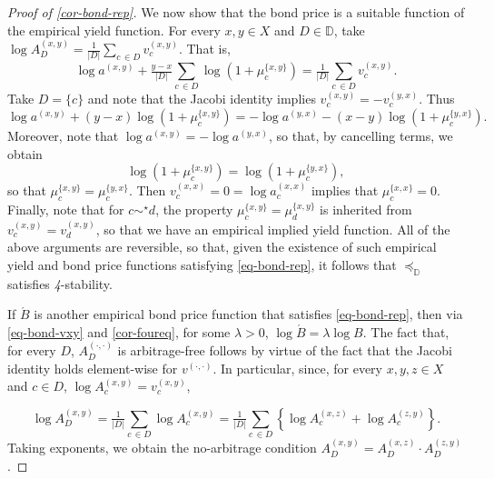 \documentclass[12pt,a4paper,twoside]{article}
\newcommand{\mbbd}{{\mathds D}}
\newcommand{\xx}{(x,x)}
\newcommand{\xy}{{(x, y)}}
\newcommand{\yx}{{(y, x)}}
\newcommand{\zy}{{(z,y)}}
\newcommand{\xz}{{(x,z)}}
\newcommand{\dd}{{(\cdot,\cdot)}}
\newcommand{\stability}{\textit{4}-\textup{{stability}}}
\begin{document}
\begin{proof}[Proof of \cref{cor-bond-rep}]
We now show that the bond price is a suitable function of the empirical yield
  function.  For every $x,y \in X$ and $D \in \mbbd$, take $\log
  {A}^{\xy}_{D} = \tfrac{1}{\lvert D\rvert}\sum_{c\,\in D}v^{\xy}_{c}$. 
  That is,
  \begin{equation*}\log a^{\xy} +
  \tfrac{y - x}{\lvert D\rvert} \sum_{c\,\in D}\log
  \left(1+\mu^{\{x,y\}}_{c}\right) = \tfrac{1}{\lvert D\rvert}\sum_{c\,\in D} v^{\xy}_{c}. \end{equation*}
Take $D = \{c\}$ and note that the Jacobi identity implies $v^{\xy}_c = -
  v^{\yx}_c$. Thus
  \begin{equation*}\log a^{\xy} + (y - x) \log \left(1+\mu^{\{x,y\}}_{c}\right) = -\log
  a^{\yx} - (x - y) \log \left(1+\mu^{\{y,x\}}_{c}\right). \end{equation*}
Moreover, note
  that $\log a^{\xy} = -\log a^{\yx}$, so that, by cancelling terms, we obtain
  \begin{equation}\label{eq-mu-sym} \log \left(1+\mu^{\{x,y\}}_{c}\right)
    = \log \left(1+\mu^{\{y,x\}}_{c}\right),
  \end{equation}
so that $\mu^{\{x,y\}}_{c} = \mu^{\{y,x\}}_{c}$.
  Then $v^{\xx}_{c} = 0 = \log a^{\xx}_{c} $ implies that $\mu^{\{x,x\}}_{c} = 0$.
 Finally, note that for $c \sim^{\star} d$, the property $\mu^{\{x,y\}}_{c} =
 \mu^{\{x,y\}}_{d}$ is inherited from $v^{\xy}_{c} = v^{\xy}_{d}$, so that we
 have an empirical implied yield function. All of the above arguments are
  reversible, so that, given the existence of such empirical yield and bond
  price functions satisfying \eqref{eq-bond-rep}, it follows that
  $\preceq_{\mbbd}$ satisfies \stability.

If $\acute{B}$ is another empirical bond price function that satisfies
  \eqref{eq-bond-rep}, then via \cref{eq-bond-vxy} and \cref{cor-foureq}, for
  some $\lambda >0$, $\log \acute{B} = \lambda \log B$.  The fact that, for
  every $D$, ${A}^{\dd}_{D}$ is arbitrage-free follows by virtue of the fact
  that the Jacobi identity holds element-wise for $v^{\dd}$.  In particular,
  since, for every $x, y , z \in X$ and $c \in D$, $\log {A}^{\xy}_{c} =
  v^{\xy}_{c}$, 

  \begin{equation*}
    \log {A}^{\xy}_{D} = \tfrac{1}{\lvert D\rvert}\sum_{c\,\in D}\log
    {A}^{\xy}_c
  = \tfrac{1}{\lvert D\rvert}\sum_{c\,\in D} \left\{\log {A}^{\xz}_c + \log
    {A}^{\zy}_c \right\}.
  \end{equation*} 
Taking exponents, we obtain the no-arbitrage condition ${A}^{\xy}_{D} =
{A}^{\xz}_{D} \cdot {A}^{\zy}_{D}$.
\end{proof}
\end{document}
